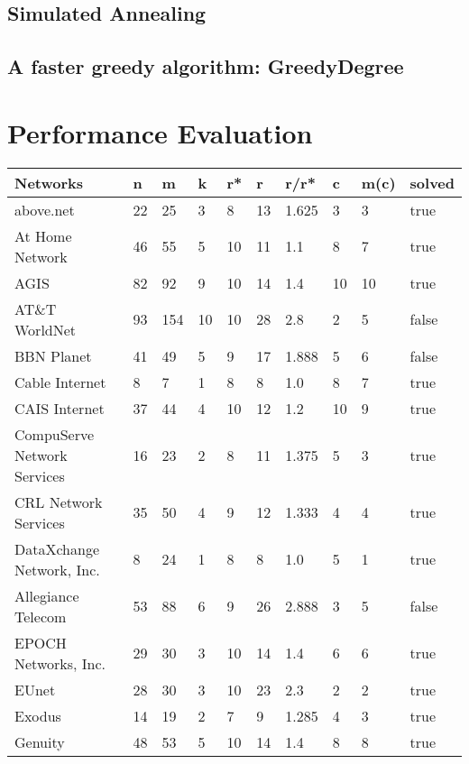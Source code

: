\documentclass [12pt]{article}
\begin{document}
\subsection{Simulated Annealing}

\subsection{A faster greedy algorithm: GreedyDegree}

\section{Performance Evaluation}
\newpage  
\thispagestyle{empty}
\begin{table}[H]
  \begin{tabular}{ | l | l | l | l | l | l | l | l | l | l | }
    \hline
    Networks & n & m &k & r* & r & r/r* & c & m(c) & solved \\ \hline
    above.net & 22 & 25 & 3 & 8 & 13 & 1.625 & 3 & 3 & true\\ \hline
    At Home Network & 46 & 55 & 5 & 10 & 11 & 1.1 & 8 & 7 & true\\ \hline
    AGIS & 82 & 92 & 9 & 10 & 14 & 1.4 & 10 & 10 & true\\ \hline
    AT\&T WorldNet & 93 & 154 & 10 & 10 & 28 & 2.8 & 2 & 5 & false\\ \hline
    BBN Planet & 41 & 49 & 5 & 9 & 17 & 1.888 & 5 & 6 & false\\ \hline
    Cable Internet & 8 & 7 & 1 & 8 & 8 & 1.0 & 8 & 7 & true\\ \hline
    CAIS Internet & 37 & 44 & 4 & 10 & 12 & 1.2 & 10 & 9 & true\\ \hline
    CompuServe Network Services & 16 & 23 & 2 & 8 & 11 & 1.375 & 5 & 3 & true\\ \hline
    CRL Network Services & 35 & 50 & 4 & 9 & 12 & 1.333 & 4 & 4 & true\\ \hline
    DataXchange Network, Inc. & 8 & 24 & 1 & 8 & 8 & 1.0 & 5 & 1 & true\\ \hline
    Allegiance Telecom & 53 & 88 & 6 & 9 & 26 & 2.888 & 3 & 5 & false\\ \hline
    EPOCH Networks, Inc. & 29 & 30 & 3 & 10 & 14 & 1.4 & 6 & 6 & true\\ \hline
    EUnet & 28 & 30 & 3 & 10 & 23 & 2.3 & 2 & 2 & true\\ \hline
    Exodus & 14 & 19 & 2 & 7 & 9 & 1.285 & 4 & 3 & true\\ \hline
    Genuity & 48 & 53 & 5 & 10 & 14 & 1.4 & 8 & 8 & true\\ \hline

\end{tabular}
\end{table}
\end{document}
